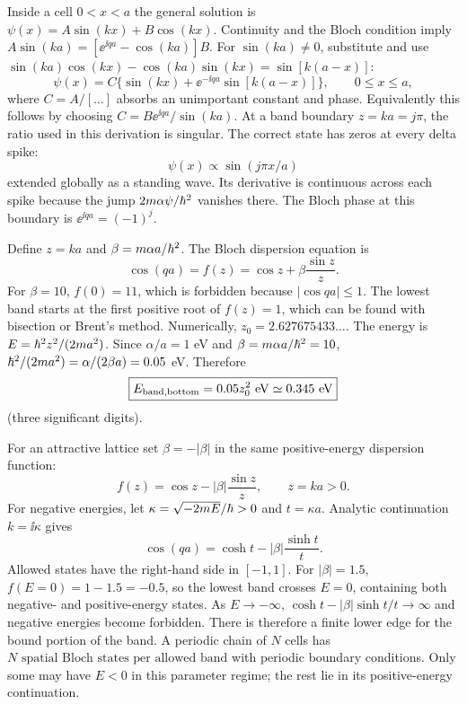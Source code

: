 Inside a cell $0<x<a$ the general solution
is $\psi(x)=A\sin(kx)+B\cos(kx)$.
Continuity and the Bloch condition imply
$A\sin(ka)=[\ee^{\ii qa}-\cos(ka)]B$.
For $\sin(ka)\ne0$, substitute and
use $\sin(ka)\cos(kx)-\cos(ka)\sin(kx)
=\sin[k(a-x)]$:
\begin{equation}
\boxed{\psi(x)=C\{
\sin(kx)+\ee^{-\ii qa}\sin[k(a-x)]\}},
\qquad 0\le x\le a,
\end{equation}
where $C=A/[\ldots]$ absorbs an
unimportant constant and phase.
Equivalently this follows by choosing
$C=B\ee^{\ii qa}/\sin(ka)$.
At a band boundary $z=ka=j\pi$,
the ratio used in this derivation is
singular. The correct state has zeros
at every delta spike:
\begin{equation}
\boxed{\psi(x)\propto
\sin(j\pi x/a)}
\end{equation}
extended globally as a standing wave.
Its derivative is continuous across
each spike because the jump
$2m\alpha\psi/\hbar^2$ vanishes there.
The Bloch phase at this boundary is
$\ee^{\ii qa}=(-1)^j$.

Define $z=ka$ and
$\beta=m\alpha a/\hbar^2$.
The Bloch dispersion equation is
\begin{equation}
\boxed{\cos(qa)=f(z)=
\cos z+\beta\frac{\sin z}{z}}.
\end{equation}
For $\beta=10$, $f(0)=11$,
which is forbidden because $|\cos qa|\le1$.
The lowest band starts at the first
positive root of
$f(z)=1$, which can be found with
bisection or Brent's method.
Numerically, $\boxed{z_0=2.627675433\ldots}$.
The energy is $E=\hbar^2z^2/(2ma^2)$.
Since $\alpha/a=1$ eV and
$\beta=m\alpha a/\hbar^2=10$,
$\hbar^2/(2ma^2)=\alpha/(2\beta a)=0.05$ eV.
Therefore
\begin{equation}
\boxed{E_{\rm band,bottom}=
0.05z_0^2\ {\rm eV}\simeq0.345\ {\rm eV}}
\end{equation}
(three significant digits).

For an attractive lattice set
$\beta=-|\beta|$ in the same
positive-energy dispersion function:
\begin{equation}
f(z)=\cos z-|\beta|\frac{\sin z}{z},
\qquad z=ka>0.
\end{equation}
For negative energies, let
$\kappa=\sqrt{-2mE}/\hbar>0$
and $t=\kappa a$. Analytic continuation
$k=\ii\kappa$ gives
\begin{equation}
\boxed{\cos(qa)=
\cosh t-|\beta|\frac{\sinh t}{t}}.
\end{equation}
Allowed states have the right-hand
side in $[-1,1]$. For $|\beta|=1.5$,
$f(E=0)=1-1.5=-0.5$, so the
lowest band crosses $E=0$, containing
both negative- and positive-energy
states. As $E\to-\infty$,
$\cosh t-|\beta|\sinh t/t\to\infty$
and negative energies become forbidden.
There is therefore a finite lower edge
for the bound portion of the band.
A periodic chain of $N$ cells has
$\boxed{N\text{ spatial Bloch states
per allowed band}}$ with periodic
boundary conditions. Only some may
have $E<0$ in this parameter regime;
the rest lie in its positive-energy
continuation.

